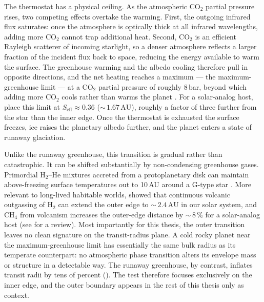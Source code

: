 The thermostat has a physical ceiling.  As the atmospheric CO$_2$
partial pressure rises, two competing effects overtake the warming.
First, the outgoing infrared flux saturates: once the atmosphere is
optically thick at all infrared wavelengths, adding more CO$_2$
cannot trap additional heat.  Second, CO$_2$ is an efficient Rayleigh
scatterer of incoming starlight, so a denser atmosphere reflects a
larger fraction of the incident flux back to space, reducing the
energy available to warm the surface.  The greenhouse warming and
the albedo cooling therefore pull in opposite directions, and the
net heating reaches a maximum --- the maximum-greenhouse limit ---
at a CO$_2$ partial pressure of roughly 8\,bar, beyond which adding
more CO$_2$ cools rather than warms the planet \parencite{Kasting1993}.
For a solar-analog host, \textcite{Kopparapu2013} place this limit at
$S_\mathrm{eff}\approx 0.36$ (${\sim}\,1.67\,\mathrm{AU}$), roughly a
factor of three further from the star than the inner edge.  Once the
thermostat is exhausted the surface freezes, ice raises the planetary
albedo further, and the planet enters a state of runaway glaciation.

Unlike the runaway greenhouse, this transition is gradual rather than
catastrophic.  It can be shifted substantially by non-condensing greenhouse gases.
Primordial H$_2$--He mixtures accreted from a protoplanetary disk can
maintain above-freezing surface temperatures out to 10\,AU around a
G-type star \parencite{PierrehumbertGaidos2011}.  More relevant to
long-lived habitable worlds, \textcite{RamirezKaltenegger2017} showed
that continuous volcanic outgassing of H$_2$ can extend the outer edge
to ${\sim}\,2.4\,\mathrm{AU}$ in our solar system, and CH$_4$ from
volcanism increases the outer-edge distance by ${\sim}\,8\,\%$ for a
solar-analog host (see \textcite{Ramirez2018} for a review).
Most importantly for this thesis, the outer transition leaves no
clean signature on the transit-radius plane.  A cold rocky planet
near the maximum-greenhouse limit has essentially the same bulk radius
as its temperate counterpart: no atmospheric phase transition alters
its envelope mass or structure in a detectable way.  The runaway
greenhouse, by contrast, inflates transit radii by tens of percent
().  The \HZIED test therefore focuses
exclusively on the inner edge, and the outer boundary appears in
the rest of this thesis only as context.


